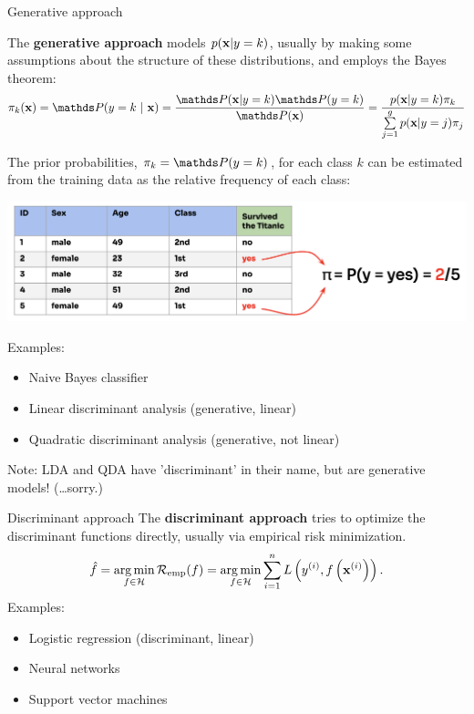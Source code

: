 \documentclass[11pt,compress,t,notes=noshow, xcolor=table]{beamer}
\begin{document}
\begin{vbframe}{Generative approach}

The \textbf{generative approach}
models $p(\mathbf{x} | y= k)$, usually by making some assumptions about the structure of these distributions, and employs the Bayes theorem:
$$\pikx = \postk = \frac{\P(\xv | y = k) \P(y = k)}{\P(\xv)} = \frac{\pdfxyk \pik}{\sumjg \pdfxyk[j] \pi_j}$$

The prior probabilities, $\pi_k = \P(y = k)$, for each class $k$ can be estimated from the training data as the relative frequency of each class:

\begin{center}
  \includegraphics{figure_man/prior_probabilities.png} 
\end{center}

\framebreak

Examples:
\begin{itemize}
\item Naive Bayes classifier
\item Linear discriminant analysis (generative, linear)
\item Quadratic discriminant analysis (generative, not linear)
\end{itemize}

{\small Note: LDA and QDA have 'discriminant' in their name, but are generative models! (\dots sorry.)}
\end{vbframe}

\begin{vbframe}{Discriminant approach}
  The \textbf{discriminant approach} tries to optimize the discriminant functions directly, usually via empirical
  risk minimization.
  $$ \hat{f} = \operatorname*{arg\,min}_{f \in \mathcal{H}} \mathcal{R}_{\text{emp}}(f) = \operatorname*{arg\,min}_{f \in \mathcal{H}} \sum\limits_{i=1}^n L\left(y^{(i)}, f\left(\mathbf{x}^{(i)}\right)\right).$$
  \lz
  Examples:
  \begin{itemize}
  \item Logistic regression (discriminant, linear)
  \item Neural networks 
  \item Support vector machines
  \end{itemize}


\end{vbframe}

\endlecture
\end{document}
